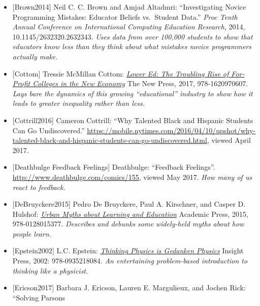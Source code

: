 \documentclass[10pt,statementpaper]{memoir}
\begin{document}
\begin{itemize}
\item
  \protect\hypertarget{brown-empirical}{}{{[}Brown2014{]}} Neil C. C.
  Brown and Amjad Altadmri: ``Investigating Novice Programming Mistakes:
  Educator Beliefs vs.~Student Data.'' \emph{Proc Tenth Annual
  Conference on International Computing Education Research}, 2014,
  10.1145/2632320.2632343. \emph{Uses data from over 100,000 students to
  show that educators know less than they think about what mistakes
  novice programmers actually make.}
\item
  \protect\hypertarget{cottom-lower-ed}{}{{[}Cottom{]}} {Tressie
  McMillan Cottom:
  \emph{\href{https://www.amazon.com/Lower-Ed-Troubling-Profit-Colleges/dp/1620970600/}{Lower
  Ed: The Troubling Rise of For-Profit Colleges in the New Economy}} The
  New Press, 2017, 978-1620970607. \emph{Lays bare the dynamics of this
  growing ``educational'' industry to show how it leads to greater
  inequality rather than less.}}
\item
  \protect\hypertarget{cottrill-gifted}{}{{[}Cottrill2016{]}} Cameron
  Cottrill: ``Why Talented Black and Hispanic Students Can Go
  Undiscovered.''
  \url{https://mobile.nytimes.com/2016/04/10/upshot/why-talented-black-and-hispanic-students-can-go-undiscovered.html},
  viewed April 2017.
\item
  \protect\hypertarget{deathbulge-feedback-feeling}{}{{[}Deathbulge
  Feedback Feelings{]}} Deathbulge: ``Feedback Feelings''.
  \url{http://www.deathbulge.com/comics/155}, viewed May 2017. \emph{How
  many of us react to feedback.}
\item
  \protect\hypertarget{debruyckere-urban-myths}{}{{[}DeBruyckere2015{]}}
  Pedro De Bruyckere, Paul A. Kirschner, and Casper D. Hulshof:
  \emph{\href{https://www.amazon.com/Urban-Myths-about-Learning-Education/dp/0128015373/}{Urban
  Myths about Learning and Education}} Academic Press, 2015,
  978-0128015377. \emph{Describes and debunks some widely-held myths
  about how people learn.}
\item
  \protect\hypertarget{epstein-thinking-physics}{}{{[}Epstein2002{]}}
  L.C. Epstein:
  \emph{\href{https://www.amazon.com/Thinking-Physics-Understandable-Practical-Reality/dp/0935218084/}{Thinking
  Physics is Gedanken Physics}} Insight Press, 2002: 978-0935218084.
  \emph{An entertaining problem-based introduction to thinking like a
  physicist.}
\item
  \protect\hypertarget{ericson-parsons}{}{{[}Ericson2017{]}} {Barbara J.
  Ericson, Lauren E. Margulieux, and Jochen Rick: ``Solving Parsons
}
\end{itemize}
\end{document}
